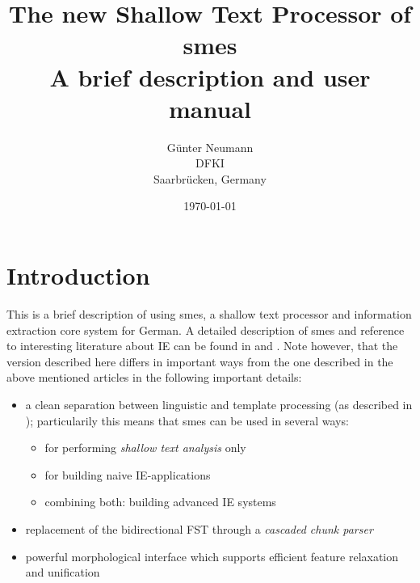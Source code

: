 \newcommand{\smes}{{\sc smes}}


\author{G\"unter Neumann\\ DFKI \\ Saarbr\"ucken, Germany}
\title{The new Shallow Text Processor of {\sc smes}
 \\ A brief description and user manual}
\date{\today}


\maketitle

\section{Introduction}
This is a brief description of using {\sc smes}, a shallow text
processor and information 
extraction core system for German. A detailed description of {\sc smes}
and reference to interesting literature about IE can be found in
\cite{Neumann:97a} and \cite{Neumann:97b}. 
Note however, that the version described here
differs in important ways from the one described in the above mentioned
articles in the following important details:

\begin{itemize}
\item   a clean separation between linguistic and template processing
        (as described in \cite{NeumannMazzini:98}); particularily this
        means that {\sc smes} can be used in several ways:

        \begin{itemize}
        \item   for performing {\em shallow text analysis} only
                
        \item   for building naive IE-applications

        \item   combining both: building advanced IE systems

        \end{itemize}
\item   replacement of the bidirectional FST through a
        {\em cascaded chunk parser}

\item   powerful morphological interface which supports efficient
        feature relaxation and unification
\end{itemize}

